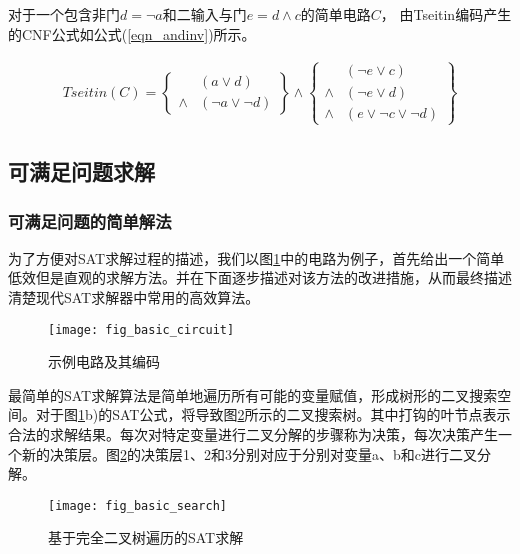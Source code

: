 对于一个包含非门$d=\neg a$和二输入与门$e=d\wedge c$的简单电路$C$，
由Tseitin编码产生的CNF公式如公式(\ref{eqn_andinv})所示。


\begin{multline}\label{eqn_andinv}
Tseitin(C)=
\left\{
\begin{array}{cc}
& (a\vee d) \\
\wedge & (\neg a\vee \neg d)
\end{array}
\right\}\wedge\left\{
\begin{array}{cc}
& (\neg e\vee c) \\
\wedge & (\neg e\vee d) \\
\wedge & (e\vee \neg c\vee\neg d)
\end{array}
\right\}
\end{multline}


\subsection{可满足问题求解}

\subsubsection{可满足问题的简单解法}
为了方便对SAT求解过程的描述，我们以图\ref{basic_circuit}中的电路为例子，首先给出一个简单低效但是直观的求解方法。并在下面逐步描述对该方法的改进措施，从而最终描述清楚现代SAT求解器中常用的高效算法。

\begin{figure}[t] %
  \centering
  \texttt{[image: fig\_basic\_circuit]}
  \caption{示例电路及其编码}
  \label{basic_circuit}
\end{figure}


最简单的SAT求解算法是简单地遍历所有可能的变量赋值，形成树形的二叉搜索空间。对于图\ref{basic_circuit}b)的SAT公式，将导致图\ref{basic_search}所示的二叉搜索树。其中打钩的叶节点表示合法的求解结果。每次对特定变量进行二叉分解的步骤称为决策，每次决策产生一个新的决策层。图\ref{basic_search}的决策层1、2和3分别对应于分别对变量a、b和c进行二叉分解。

\begin{figure}[b] %
  \centering
  \texttt{[image: fig\_basic\_search]}
  \caption{基于完全二叉树遍历的SAT求解}
  \label{basic_search}
\end{figure}


